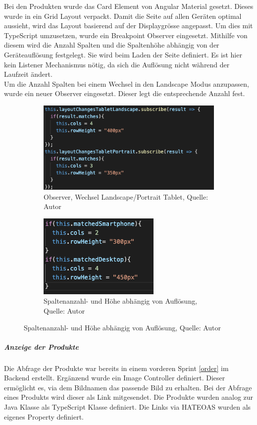 Bei den Produkten wurde das Card Element von Angular Material gesetzt. Dieses wurde in ein Grid Layout verpackt. Damit die Seite auf allen Geräten optimal aussieht, wird das Layout basierend auf der Displaygrösse angepasst. Um dies mit TypeScript umzusetzen, wurde ein Breakpoint Observer eingesetzt. Mithilfe von diesem wird die Anzahl Spalten und die Spaltenhöhe abhängig von der Geräteauflösung festgelegt. Sie wird beim Laden der Seite definiert. Es ist hier kein Listener Mechanismus nötig, da sich die Auflösung nicht während der Laufzeit ändert.\\ Um die Anzahl Spalten bei einem Wechsel in den Landscape Modus anzupassen, wurde ein neuer Observer eingesetzt. Dieser legt die entsprechende Anzahl fest. 
\begin{figure}[H]
	\begin{subfigure}[b]{0.4\textwidth}
		\includegraphics[scale=0.4]{images/rowsLand.PNG}
		\caption[Observer, Wechsel Landscape/Portrait Tablet]{Observer, Wechsel Landscape/Portrait Tablet, Quelle: Autor}
		\label{img: Landscape observer}
	\end{subfigure}
	\hfill
	\begin{subfigure}[b]{0.4\textwidth}
		\includegraphics[scale=0.6]{images/rowsRes.PNG}
		\caption[Spaltenanzahl- und Höhe abhängig von Auflösung]{Spaltenanzahl- und Höhe abhängig von Auflösung, Quelle: Autor}
		\label{img: Resolution Observer}
	\end{subfigure}
\end{figure} 

\subparagraph{Anzeige der Produkte}
Die Abfrage der Produkte war bereits in einem vorderen Sprint \ref{order} im Backend erstellt. Ergänzend wurde ein Image Controller definiert. Dieser ermöglicht es, via dem Bildnamen das passende Bild zu erhalten. Bei der Abfrage eines Produkts wird dieser als Link mitgesendet. Die Produkte wurden analog zur Java Klasse als TypeScript Klasse definiert. Die Links via \ac{HATEOAS} wurden als eigenes Property definiert. 

